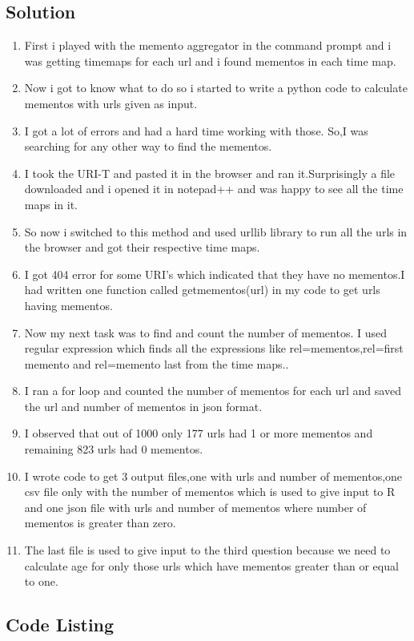 \subsection{Solution}
\begin{enumerate}
\item First i played with the memento aggregator in the command prompt and i was getting timemaps for each url and i found mementos in each time map.
\item Now i got to know what to do so i started to write a python code to calculate mementos with urls given as input. 
\item I got a lot of errors and had a hard time working with those. So,I was searching for any other way to find the mementos.
\item I took the URI-T and pasted it in the browser and ran it.Surprisingly a file downloaded and i opened it in notepad++ and 		was happy to see all the time maps in it.
\item So now i switched to this method and used urllib library to run all the urls in the browser and got their respective time maps.
\item I got 404 error for some URI's which indicated that they have no mementos.I had written one function called getmementos(url) in my code to get urls having mementos.
\item Now my next task was to find and count the number of mementos. I used regular expression which finds all the expressions like rel=mementos,rel=first memento and rel=memento last from the time maps..
\item I ran a for loop and counted the number of mementos for each url and saved the url and number of mementos in json format.
\item I observed that out of 1000 only 177 urls had 1 or more mementos and remaining 823 urls had 0 mementos.
\item I wrote code to get 3 output files,one with urls and number of mementos,one csv file only with the number of mementos which is used to give input to R and one json file with urls and number of mementos where number of mementos is greater than zero.  
\item The last file is used to give input to the third question because we need to calculate age for only those urls which have mementos greater than or equal to one.
  
\end{enumerate}
\newpage
\subsection{Code Listing}

